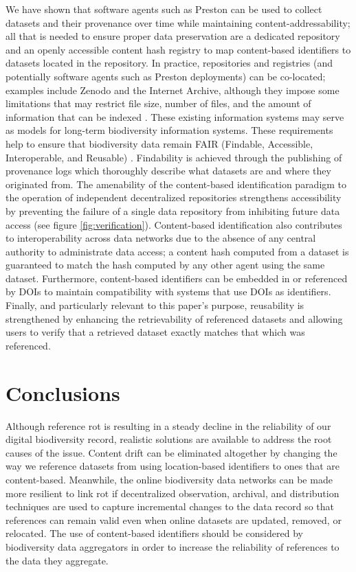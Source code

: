 We have shown that software agents such as Preston can be used to collect datasets and their provenance over time while maintaining content-addressability; all that is needed to ensure proper data preservation are a dedicated repository and an openly accessible content hash registry to map content-based identifiers to datasets located in the repository. In practice, repositories and registries (and potentially software agents such as Preston deployments) can be co-located; examples include Zenodo and the Internet Archive, although they impose some limitations that may restrict file size, number of files, and the amount of information that can be indexed \citep{zenodo_2019,archive_2019}. These existing information systems may serve as models for long-term biodiversity information systems. These requirements help to ensure that biodiversity data remain FAIR (Findable, Accessible, Interoperable, and Reusable) \citep{Wilkinson_2016}. Findability is achieved through the publishing of provenance logs which thoroughly describe what datasets are and where they originated from. The amenability of the content-based identification paradigm to the operation of independent decentralized repositories strengthens accessibility by preventing the failure of a single data repository from inhibiting future data access (see figure \ref{fig:verification}). Content-based identification also contributes to interoperability across data networks due to the absence of any central authority to administrate data access; a content hash computed from a dataset is guaranteed to match the hash computed by any other agent using the same dataset. Furthermore, content-based identifiers can be embedded in or referenced by DOIs to maintain compatibility with systems that use DOIs as identifiers. Finally, and particularly relevant to this paper's purpose, reusability is strengthened by enhancing the retrievability of referenced datasets and allowing users to verify that a retrieved dataset exactly matches that which was referenced.



\section*{Conclusions}
Although reference rot is resulting in a steady decline in the reliability of our digital biodiversity record, realistic solutions are available to address the root causes of the issue. Content drift can be eliminated altogether by changing the way we reference datasets from using location-based identifiers to ones that are content-based. Meanwhile, the online biodiversity data networks can be made more resilient to link rot if decentralized observation, archival, and distribution techniques are used to capture incremental changes to the data record so that references can remain valid even when online datasets are updated, removed, or relocated. The use of content-based identifiers should be considered by biodiversity data aggregators in order to increase the reliability of references to the data they aggregate.

